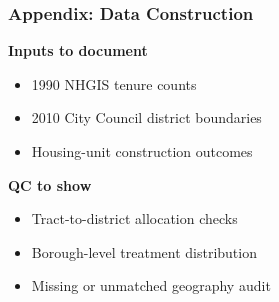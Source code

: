 
\begin{frame}
    \frametitle{Appendix: Data Construction}

    \textbf{Inputs to document}
    \begin{itemize}
        \item 1990 NHGIS tenure counts
        \item 2010 City Council district boundaries
        \item Housing-unit construction outcomes
    \end{itemize}

    \vspace{0.5em}
    \textbf{QC to show}
    \begin{itemize}
        \item Tract-to-district allocation checks
        \item Borough-level treatment distribution
        \item Missing or unmatched geography audit
    \end{itemize}
\end{frame}
